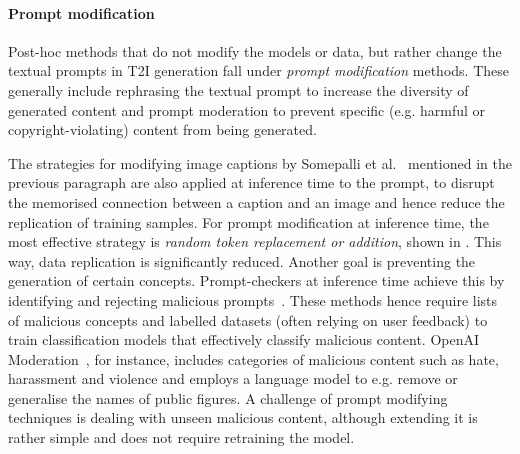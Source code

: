 \documentclass[conference,table]{IEEEtran} %
\begin{document}
\paragraph{Prompt modification}\label{sec:mitigation-sanitising-prompt}
Post-hoc methods that do not modify the models or data, but rather change the textual prompts in T2I generation fall under \textit{prompt modification} methods.
These generally include rephrasing the textual prompt to increase the diversity of generated content and prompt moderation to prevent specific (e.g. harmful or copyright-violating) content from being generated. 

The strategies for modifying image captions by Somepalli et al.~\cite{somepalli_understanding_2023} mentioned in the previous paragraph are also applied at inference time to the prompt, to disrupt the memorised connection between a caption and an image and hence reduce the replication of training samples. 
For prompt modification at inference time, the most effective strategy is \textit{random token replacement or addition}, shown in .
This way, data replication is significantly reduced. 
Another goal is preventing the generation of certain concepts.
Prompt-checkers at inference time achieve this by identifying and rejecting malicious prompts~\cite{hanu_detoxify_2020,noauthor_openai_2023}.
These methods hence require lists of malicious concepts and labelled datasets (often relying on user feedback) to train classification models that effectively classify malicious content. 
OpenAI Moderation~\cite{noauthor_openai_2023}, for instance, includes categories of malicious content such as hate, harassment and violence and employs a language model to e.g. remove or generalise the names of public figures. 
A challenge of prompt modifying techniques is dealing with unseen malicious content, although extending it is rather simple and does not require retraining the model.
 


\end{document}
